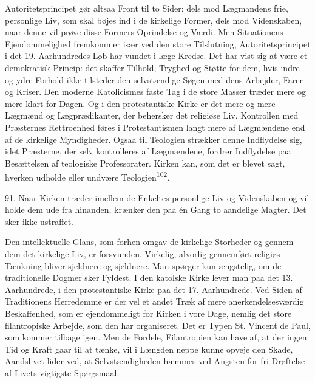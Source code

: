 \documentclass[12pt,a4paper,openany]{book}
\newcommand{\opage}[1]{\marginnote{\footnotesize\textit{[#1]}}}
\begin{document}
Autoritetsprincipet gør altsaa Front til to Sider: dels mod Lægmandens
frie, personlige Liv, som skal bøjes ind i de kirkelige Former, dels mod
Videnskaben, naar denne vil prøve disse Formers Oprindelse og Værdi. Men
Situationens Ejendommelighed fremkommer især ved den store Tilslutning,
Autoritetsprincipet i det 19. Aarhundredes Løb har vundet i læge Kredse.
Det har vist sig at være et demokratisk Princip: det skaffer Tilhold,
Tryghed og Støtte for dem, hvis indre og ydre Forhold ikke tilsteder den
selvstændige Søgen med dens Arbejder, Farer og Kriser. Den moderne
Katolicismes faste Tag i de store Masser træder mere og mere klart for
Dagen. Og i den protestantiske Kirke er det mere og mere Lægmænd og
Lægprædikanter, der behersker det religiøse Liv. Kontrollen med
Præsternes Rettroenhed føres i Protestantismen langt mere af Lægmændene
end af de kirkelige Myndigheder. Ogsaa til Teologien strækker denne
Indflydelse sig, idet Præsterne, der selv kontrolleres af Lægmændene,
fordrer Indflydelse paa Besættelsen af teologiske Professorater. Kirken
kan, som det er blevet sagt, hverken udholde eller undvære
Teologien\textsuperscript{102}.

91. Naar Kirken træder imellem de Enkeltes personlige Liv og Videnskaben
og vil holde dem ude fra hinanden, krænker den paa én Gang to aandelige
Magter. Det sker ikke ustraffet.

Den intellektuelle Glans, som forhen omgav de kirkelige Storheder og
gennem dem det kirkelige Liv, er forsvunden. Virkelig, alvorlig
gennemført religiøs Tænkning bliver sjeldnere og sjeldnere. Man spørger
kun ængstelig, om de traditionelle Dogmer
\opage{208}sker Fyldest. I den katolske Kirke lever man paa det 13.
Aarhundrede, i den protestantiske Kirke paa det 17. Aarhundrede. Ved
Siden af Traditionens Herredømme er der vel et andet Træk af mere
anerkendelsesværdig Beskaffenhed, som er ejendommeligt for Kirken i vore
Dage, nemlig det store filantropiske Arbejde, som den har organiseret.
Det er Typen St. Vincent de Paul, som kommer tilbage igen. Men de
Fordele, Filantropien kan have af, at der ingen Tid og Kraft gaar til at
tænke, vil i Længden neppe kunne opveje den Skade, Aandslivet lider ved,
at Selvstændigheden hæmmes ved Angsten for fri Drøftelse af Livets
vigtigste Spørgsmaal.
\end{document}
